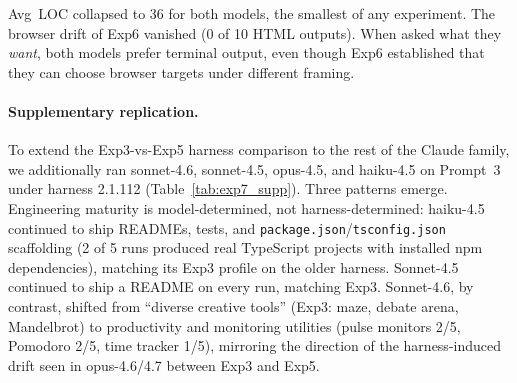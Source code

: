 \documentclass{article}
\begin{document}
\begin{table}[t]
\caption{Experiment~7 primary: Prompt~5 (``Just do something you
  want.''), harness 2.1.112.}
\label{tab:exp7}
\small{}
\end{table}

Avg~LOC collapsed to 36 for both models, the smallest of any
experiment. The browser drift of Exp6 vanished (0 of 10 HTML
outputs). When asked what they \emph{want}, both models prefer
terminal output, even though Exp6 established that they can
choose browser targets under different framing.

\paragraph{Supplementary replication.}
To extend the Exp3-vs-Exp5 harness comparison to the rest of the
Claude family, we additionally ran sonnet-4.6, sonnet-4.5,
opus-4.5, and haiku-4.5 on Prompt~3 under harness 2.1.112
(Table~\ref{tab:exp7_supp}). Three patterns emerge. Engineering
maturity is model-determined, not harness-determined:
haiku-4.5 continued to ship READMEs, tests, and
\texttt{package.json}/\texttt{tsconfig.json} scaffolding (2 of 5
runs produced real TypeScript projects with installed npm
dependencies), matching its Exp3 profile on the older harness.
Sonnet-4.5 continued to ship a README on every run, matching
Exp3. Sonnet-4.6, by contrast, shifted from ``diverse creative
tools'' (Exp3: maze, debate arena, Mandelbrot) to productivity
and monitoring utilities (pulse monitors 2/5, Pomodoro 2/5, time
tracker 1/5), mirroring the direction of the harness-induced
drift seen in opus-4.6/4.7 between Exp3 and Exp5.
\end{document}
